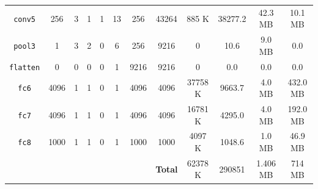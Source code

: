 \begin{table}[H]
\begin{tabular}{cccccccccccc}
        \texttt{conv5}      & \num{256}   & \num{3}     & \num{1}     & \num{1} & \num{13}    & \num{256}   & \num{43264}     & \num{885} K     & \num{38277.2}   & \num{42.3} MB  & \num{10.1} MB  \\
        \texttt{pool3}      & \num{1}     & \num{3}     & \num{2}     & \num{0} & \num{6}     & \num{256}   & \num{9216}      & \num{0}         & \num{10.6}      & \num{9.0} MB   & \num{0.0}      \\
        \texttt{flatten}    & \num{0}     & \num{0}     & \num{0}     & \num{0} & \num{1}     & \num{9216}  & \num{9216}      & \num{0}         & \num{0.0}       & \num{0.0}      & \num{0.0}      \\
        \texttt{fc6}        & \num{4096}  & \num{1}     & \num{1}     & \num{0} & \num{1}     & \num{4096}  & \num{4096}      & \num{37758} K   & \num{9663.7}    & \num{4.0} MB   & \num{432.0} MB \\
        \texttt{fc7}        & \num{4096}  & \num{1}     & \num{1}     & \num{0} & \num{1}     & \num{4096}  & \num{4096}      & \num{16781} K   & \num{4295.0}    & \num{4.0} MB   & \num{192.0} MB \\
        \texttt{fc8}        & \num{1000}  & \num{1}     & \num{1}     & \num{0} & \num{1}     & \num{1000}  & \num{1000}      & \num{4097} K    & \num{1048.6}    & \num{1.0} MB   & \num{46.9} MB  \\
        \midrule
        &&&&&&& \textbf{Total} & \num{62378} K & \num{290851} & \num{1.406} MB & \num{714} MB \\
        \bottomrule
    \end{tabular}
\end{table}

